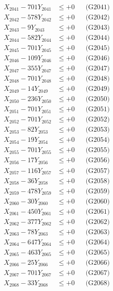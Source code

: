 \documentclass[a4paper,10pt]{article}
\begin{document}
{\begin{align}
\allowbreak
X_{2041} - 701Y_{2041} &\leq +0 && \text{(G2041)} \\
X_{2042} - 578Y_{2042} &\leq +0 && \text{(G2042)} \\
X_{2043} - 9Y_{2043} &\leq +0 && \text{(G2043)} \\
X_{2044} - 582Y_{2044} &\leq +0 && \text{(G2044)} \\
X_{2045} - 701Y_{2045} &\leq +0 && \text{(G2045)} \\
X_{2046} - 109Y_{2046} &\leq +0 && \text{(G2046)} \\
X_{2047} - 355Y_{2047} &\leq +0 && \text{(G2047)} \\
X_{2048} - 701Y_{2048} &\leq +0 && \text{(G2048)} \\
X_{2049} - 14Y_{2049} &\leq +0 && \text{(G2049)} \\
X_{2050} - 236Y_{2050} &\leq +0 && \text{(G2050)} \\
\allowbreak
X_{2051} - 701Y_{2051} &\leq +0 && \text{(G2051)} \\
X_{2052} - 701Y_{2052} &\leq +0 && \text{(G2052)} \\
X_{2053} - 82Y_{2053} &\leq +0 && \text{(G2053)} \\
X_{2054} - 19Y_{2054} &\leq +0 && \text{(G2054)} \\
X_{2055} - 701Y_{2055} &\leq +0 && \text{(G2055)} \\
X_{2056} - 17Y_{2056} &\leq +0 && \text{(G2056)} \\
X_{2057} - 116Y_{2057} &\leq +0 && \text{(G2057)} \\
X_{2058} - 36Y_{2058} &\leq +0 && \text{(G2058)} \\
X_{2059} - 478Y_{2059} &\leq +0 && \text{(G2059)} \\
X_{2060} - 30Y_{2060} &\leq +0 && \text{(G2060)} \\
\allowbreak
X_{2061} - 450Y_{2061} &\leq +0 && \text{(G2061)} \\
X_{2062} - 377Y_{2062} &\leq +0 && \text{(G2062)} \\
X_{2063} - 78Y_{2063} &\leq +0 && \text{(G2063)} \\
X_{2064} - 647Y_{2064} &\leq +0 && \text{(G2064)} \\
X_{2065} - 463Y_{2065} &\leq +0 && \text{(G2065)} \\
X_{2066} - 25Y_{2066} &\leq +0 && \text{(G2066)} \\
X_{2067} - 701Y_{2067} &\leq +0 && \text{(G2067)} \\
X_{2068} - 33Y_{2068} &\leq +0 && \text{(G2068)} \\

\end{align}}
\end{document}
